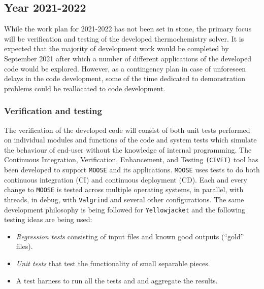 	\subsection{Year 2021-2022}
	While the work plan for 2021-2022 has not been set in stone, the primary focus will be verification and testing of the developed thermochemistry solver.  It is expected that the majority of development work would be completed by September 2021 after which a number of different applications of the developed code would be explored. However, as a contingency plan in case of unforeseen delays in the code development, some of the time dedicated to demonstration problems could be reallocated to code development.  
	
	\subsubsection{Verification and testing}
		The verification of the developed code will consist of both unit tests performed on individual modules and functions of the code and system tests which simulate the behaviour of end-user without the knowledge of internal programming. The Continuous Integration, Verification, Enhancement, and Testing \texttt{(CIVET)} tool has been developed to support \texttt{MOOSE} and its applications. \texttt{MOOSE} uses tests to do both continuous integration (CI) and continuous deployment (CD). Each and every change to \texttt{MOOSE} is tested across multiple operating systems, in parallel, with threads, in debug, with \texttt{Valgrind} and several other configurations. The same development philosophy is being followed for \texttt{Yellowjacket} and the following testing ideas are being used:
		\begin{itemize}\compresslist
			\item \emph{Regression tests} consisting of input files and known good outputs (``gold'' files).
			\item \emph{Unit tests} that test the functionality of small separable pieces.
			\item A test harness to run all the tests and and aggregate the results.
		\end{itemize} 

